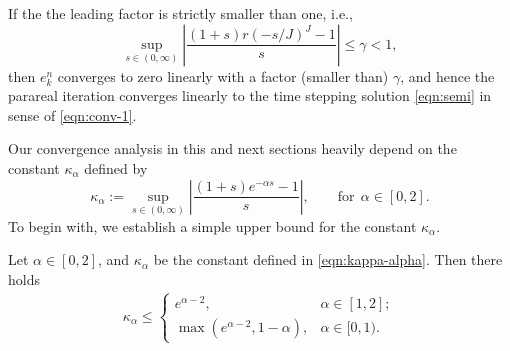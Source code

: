 If the the leading factor is strictly smaller than one, i.e.,
 \begin{equation}\label{eqn:conv-factor}
   \sup_{s\in(0,\infty)} \left|\frac{(1+s) r(-s/J)^J-1}{s}\right| \le \gamma < 1,
\end{equation}
then $e_{k}^{n}$ converges to zero linearly with a factor (smaller than) $\gamma$, and hence
the parareal iteration converges linearly to the time stepping solution \eqref{eqn:semi}
in sense of \eqref{eqn:conv-1}.





Our convergence analysis in this and next sections heavily depend on the constant $\kappa_\alpha$ defined by
\begin{equation}\label{eqn:kappa-alpha}
\kappa_\alpha := \sup_{s\in(0,\infty)}\left|\frac{(1+s)e^{-\alpha s}-1 }{s}\right|,\qquad \text{for} ~~\alpha\in[0,2].
\end{equation}
To begin with, we establish a simple upper bound for the constant $\kappa_\alpha$.

\begin{lemma}\label{lem:exp}
Let $\alpha\in[0,2]$, and $\kappa_\alpha$ be the constant defined in \eqref{eqn:kappa-alpha}.
Then there holds
\begin{equation*}
\begin{split}
\kappa_\alpha \le  \begin{cases}
  e^{\alpha-2} ,\quad &\alpha\in[1,2];\\
  \max(e^{\alpha-2}, 1-\alpha),&\alpha\in[0,1).
\end{cases}
\end{split}
\end{equation*}
\end{lemma}


